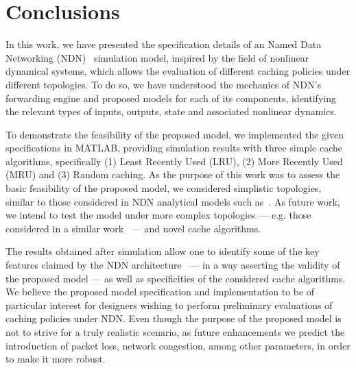 \section{Conclusions}
\label{sec:conclusions}

In this work, we have presented the specification details of an Named Data 
Networking (NDN)~\cite{Jacobson2009} simulation model, inspired by the field of nonlinear dynamical systems, which 
allows the evaluation of different caching policies under different topologies. To 
do so, we have understood the mechanics of NDN's forwarding engine and proposed 
models for each of its components, identifying the relevant types of inputs, 
outputs, state and associated nonlinear dynamics.\shortvertbreak

To demonstrate the feasibility of the proposed model, we implemented the 
given specifications in MATLAB\textsuperscript{\textregistered}, providing 
simulation results with three simple cache algorithms, specifically (1) Least Recently 
Used (LRU), (2) More Recently Used (MRU) and (3) Random caching. As the purpose 
of this work was to assess the basic feasibility of the proposed model, we 
considered simplistic topologies, similar to those considered in NDN analytical 
models such as~\cite{6038471,Psaras:2011:MEC:2008780.2008789,Psaras2012,Chai2013}. As 
future work, we intend to test the model under more complex topologies --- e.g. 
those considered in a similar work~\cite{6386648} --- and novel cache algorithms.\shortvertbreak

The results 
obtained after simulation allow one to identify some of the key features claimed 
by the NDN architecture~\cite{Jacobson2009} --- in a way asserting the validity 
of the proposed model --- as well as specificities of 
the considered cache algorithms. We believe the proposed model specification 
and implementation to be of particular interest for designers wishing to 
perform preliminary evaluations of caching policies under NDN. Even though the 
purpose of the proposed model is not to strive for a truly realistic 
scenario, as future enhancements we predict the introduction of packet loss, 
network congestion, among other parameters, in order to make it more robust.
